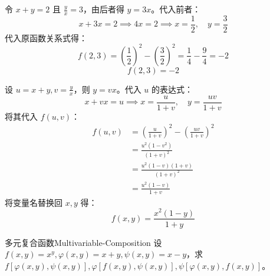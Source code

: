 \begin{solution}
    令 $x + y = 2$ 且 $\frac{y}{x} = 3$，由后者得 $y = 3x$。代入前者：
    \begin{equation}
        x + 3x = 2 \implies 4x = 2 \implies x = \frac{1}{2}, \quad y = \frac{3}{2}
    \end{equation}
    代入原函数关系式得：
    \begin{equation}
        f(2, 3) = \left( \frac{1}{2} \right)^2 - \left( \frac{3}{2} \right)^2 = \frac{1}{4} - \frac{9}{4} = -2
    \end{equation}
    \begin{equation}
        \boxed{f(2, 3) = -2}
    \end{equation}

    设 $u = x + y, v = \frac{y}{x}$，则 $y = vx$。代入 $u$ 的表达式：
    \begin{equation}
        x + vx = u \implies x = \frac{u}{1+v}, \quad y = \frac{uv}{1+v}
    \end{equation}
    将其代入 $f(u, v)$：
    \begin{equation}
        \begin{aligned}
            f(u, v) & = \left( \frac{u}{1+v} \right)^2 - \left( \frac{uv}{1+v} \right)^2 \\
                    & = \frac{u^2(1 - v^2)}{(1+v)^2}                                     \\
                    & = \frac{u^2(1-v)(1+v)}{(1+v)^2}                                    \\
                    & = \frac{u^2(1-v)}{1+v}
        \end{aligned}
    \end{equation}
    将变量名替换回 $x, y$ 得：
    \begin{equation}
        \boxed{f(x, y) = \frac{x^2(1-y)}{1+y}}
    \end{equation}
\end{solution}

\begin{problem}{多元复合函数}{Multivariable-Composition}
    设 $f(x, y) = x^y, \varphi(x, y) = x + y, \psi(x, y) = x - y$，求 $f[\varphi(x, y), \psi(x, y)], \varphi[f(x, y), \psi(x, y)], \psi[\varphi(x, y), f(x, y)]$。
\end{problem}

